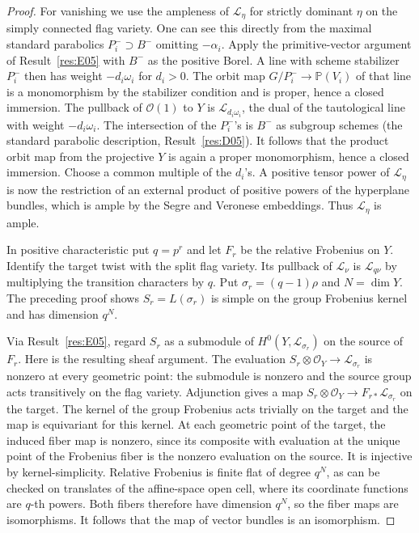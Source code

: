 \documentclass[11pt,a4paper,openany,oneside]{book}
\theoremstyle{resultstyle}
\theoremstyle{definition}
\numberwithin{equation}{chapter}
\begin{document}
\begin{proof}
For vanishing we use the ampleness of \(\mathcal L_\eta\) for strictly dominant \(\eta\) on the simply connected flag variety. One can see this directly from the maximal standard parabolics \(P_i^-\supset B^-\) omitting \(-\alpha_i\). Apply the primitive-vector argument of Result~\ref{res:E05} with \(B^-\) as the positive Borel. A line with scheme stabilizer \(P_i^-\) then has weight \(-d_i\omega_i\) for \(d_i>0\). The orbit map \(G/P_i^-\to\mathbb P(V_i)\) of that line is a monomorphism by the stabilizer condition and is proper, hence a closed immersion. The pullback of \(\mathcal O(1)\) to \(Y\) is \(\mathcal L_{d_i\omega_i}\), the dual of the tautological line with weight \(-d_i\omega_i\). The intersection of the \(P_i^-\)'s is \(B^-\) as subgroup schemes (the standard parabolic description, Result~\ref{res:D05}). It follows that the product orbit map from the projective \(Y\) is again a proper monomorphism, hence a closed immersion. Choose a common multiple of the \(d_i\)'s. A positive tensor power of \(\mathcal L_\eta\) is now the restriction of an external product of positive powers of the hyperplane bundles, which is ample by the Segre and Veronese embeddings. Thus \(\mathcal L_\eta\) is ample.

In positive characteristic put \(q=p^r\) and let \(F_r\) be
the relative Frobenius on \(Y\). Identify the target twist
with the split flag variety. Its pullback of \(\mathcal L_\nu\)
is \(\mathcal L_{q\nu}\) by multiplying the transition characters
by \(q\). Put \(\sigma_r=(q-1)\rho\) and \(N=\dim Y\).
The preceding proof shows \(S_r=L(\sigma_r)\) is simple
on the group Frobenius kernel and has dimension \(q^N\).

Via Result~\ref{res:E05}, regard \(S_r\) as a submodule of \(H^0(Y,\mathcal L_{\sigma_r})\) on the source of \(F_r\). Here is the resulting sheaf argument. The evaluation \(S_r\otimes\mathcal O_Y\to\mathcal L_{\sigma_r}\) is nonzero at every geometric point: the submodule is nonzero and the source group acts transitively on the flag variety. Adjunction gives a map \(S_r\otimes\mathcal O_Y\to F_{r*}\mathcal L_{\sigma_r}\) on the target. The kernel of the group Frobenius acts trivially on the target and the map is equivariant for this kernel. At each geometric point of the target, the induced fiber map is nonzero, since its composite with evaluation at the unique point of the Frobenius fiber is the nonzero evaluation on the source. It is injective by kernel-simplicity. Relative Frobenius is finite flat of degree \(q^N\), as can be checked on translates of the affine-space open cell, where its coordinate functions are \(q\)-th powers. Both fibers therefore have dimension \(q^N\), so the fiber maps are isomorphisms. It follows that the map of vector bundles is an isomorphism.


\end{proof}
\end{document}
